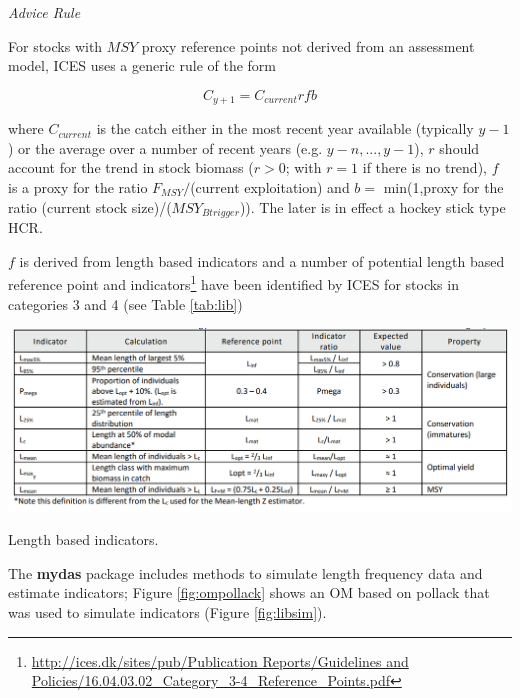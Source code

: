 \textit{Advice Rule}

For stocks with $MSY$ proxy reference points not derived from an assessment model, ICES uses a generic rule of the form 
 
\begin{equation}C_{y+1}=C_{current}rfb\end{equation}

where $C_{current}$ is the catch either in the most recent year available (typically $y-1$) or the average over a number of recent years (e.g. $y-n, ... ,y-1$), $r$ should account for the trend in stock biomass ($r>0$; with $r=1$ if there is no trend), $f$  is a proxy for the ratio $F_{MSY}/$(current exploitation) and $b=$ min(1,proxy for the ratio (current stock size)/($MSY_{Btrigger}$)). The later is in effect a hockey stick type HCR. 

$f$ is derived from length based indicators and a number of potential length based reference point and indicators\footnote{\url{http://ices.dk/sites/pub/Publication Reports/Guidelines and Policies/16.04.03.02_Category_3-4_Reference_Points.pdf}} have been identified by ICES for stocks in categories 3 and 4 (see Table \ref{tab:lib}) 

\begin{table}[h!]\centering
\includegraphics[width=\textwidth]{figs/lib.png}
\caption{Length based indicators.} 
\label{tab:lib}
\end{table}

The \textbf{mydas} package includes methods to simulate length frequency data and estimate indicators; Figure \ref{fig:ompollack} shows an OM based on pollack that was used to simulate indicators (Figure \ref{fig:libsim}).

